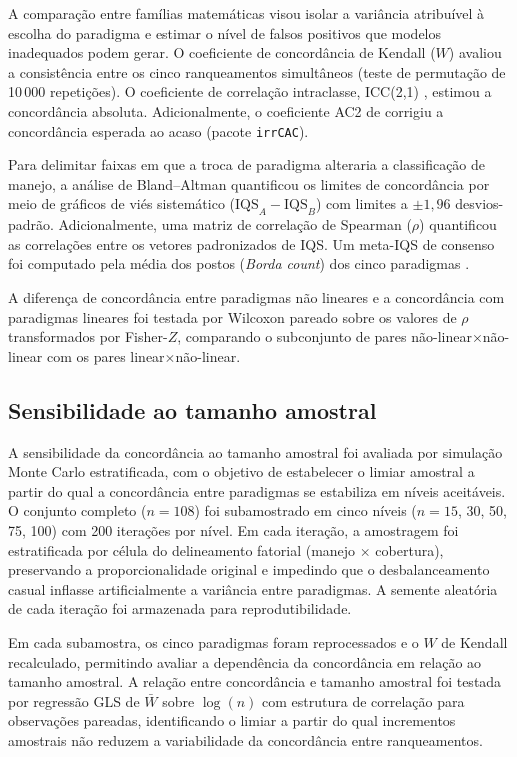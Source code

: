\documentclass[pdflatex,sn-basic]{sn-jnl}%
\begin{document}
A comparação entre famílias matemáticas visou isolar a variância atribuível à escolha do paradigma e estimar o nível de falsos positivos que modelos inadequados podem gerar. O coeficiente de concordância de Kendall ($W$) avaliou a consistência entre os cinco ranqueamentos simultâneos (teste de permutação de 10\,000 repetições). O coeficiente de correlação intraclasse, ICC(2,1) \citep{ShroutFleiss1979}, estimou a concordância absoluta. Adicionalmente, o coeficiente AC2 de \cite{Gwet2008} corrigiu a concordância esperada ao acaso (pacote \texttt{irrCAC}). 

Para delimitar faixas em que a troca de paradigma alteraria a classificação de manejo, a análise de Bland--Altman \citep{BlandAltman1986} quantificou os limites de concordância por meio de gráficos de viés sistemático ($\text{IQS}_A - \text{IQS}_B$) com limites a $\pm 1{,}96$ desvios-padrão. Adicionalmente, uma matriz de correlação de Spearman ($\rho$) quantificou as correlações entre os vetores padronizados de IQS. Um meta-IQS de consenso foi computado pela média dos postos (\textit{Borda count}) dos cinco paradigmas \citep{Lin2010}.

A diferença de concordância entre paradigmas não lineares e a concordância com paradigmas lineares foi testada por Wilcoxon pareado sobre os valores de $\rho$ transformados por Fisher-$Z$, comparando o subconjunto de pares não-linear$\times$não-linear com os pares linear$\times$não-linear.

\subsection{Sensibilidade ao tamanho amostral}\label{subsec:sensitivity}

A sensibilidade da concordância ao tamanho amostral foi avaliada por simulação Monte Carlo estratificada, com o objetivo de estabelecer o limiar amostral a partir do qual a concordância entre paradigmas se estabiliza em níveis aceitáveis. O conjunto completo ($n = 108$) foi subamostrado em cinco níveis ($n = 15$, 30, 50, 75, 100) com 200 iterações por nível. Em cada iteração, a amostragem foi estratificada por célula do delineamento fatorial (manejo $\times$ cobertura), preservando a proporcionalidade original e impedindo que o desbalanceamento casual inflasse artificialmente a variância entre paradigmas. A semente aleatória de cada iteração foi armazenada para reprodutibilidade.

Em cada subamostra, os cinco paradigmas foram reprocessados e o $W$ de Kendall recalculado, permitindo avaliar a dependência da concordância em relação ao tamanho amostral. A relação entre concordância e tamanho amostral foi testada por regressão GLS de $\bar{W}$ sobre $\log(n)$ com estrutura de correlação para observações pareadas, identificando o limiar a partir do qual incrementos amostrais não reduzem a variabilidade da concordância entre ranqueamentos.
\end{document}
